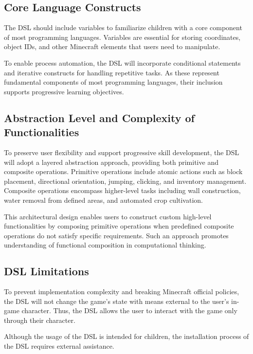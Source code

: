 \subsection{Core Language Constructs}

The DSL should include variables to familiarize children with a core component of most programming languages. 
Variables are essential for storing coordinates, object IDs, and other Minecraft elements that users need to manipulate.

To enable process automation, the DSL will incorporate conditional statements and iterative constructs for handling repetitive tasks. 
As these represent fundamental components of most programming languages, their inclusion supports progressive learning objectives.

\subsection{Abstraction Level and Complexity of Functionalities}

To preserve user flexibility and support progressive skill development, the DSL will adopt a layered abstraction approach, providing both primitive and composite operations. 
Primitive operations include atomic actions such as block placement, directional orientation, jumping, clicking, and inventory management. 
Composite operations encompass higher-level tasks including wall construction, water removal from defined areas, and automated crop cultivation.

This architectural design enables users to construct custom high-level functionalities by composing primitive operations when predefined composite operations do not satisfy specific requirements. 
Such an approach promotes understanding of functional composition in computational thinking.

\subsection{DSL Limitations}

To prevent implementation complexity and breaking Minecraft official policies, the DSL will not change the game's state with means external to the user's in-game character. 
Thus, the DSL allows the user to interact with the game only through their character.

Although the usage of the DSL is intended for children, the installation process of the DSL requires external assistance.